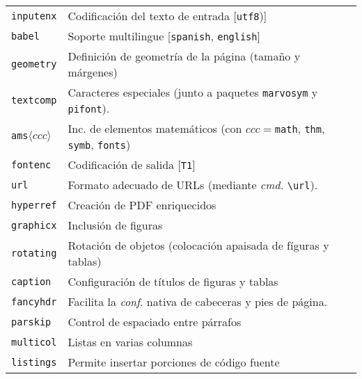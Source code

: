 \documentclass[10pt,landscape,a4paper]{article}
\begin{document}
\begin{multicols}{3}
\begin{tabular}{@{}p{\the\MyLen}%
                @{}p{\linewidth-\the\MyLen}@{}}
\texttt{inputenx}	& Codificación del texto de entrada [\texttt{utf8})]\\
\texttt{babel}		& Soporte multilingue [\texttt{spanish}, \texttt{english}]\\
\texttt{geometry}	& Definición de geometría de la página (tamaño y márgenes)\\
\texttt{textcomp}	& Caracteres especiales (junto a paquetes \texttt{marvosym} y \texttt{pifont}). \\
\texttt{ams}$\langle ccc \rangle$ & Inc. de elementos matemáticos (con $ccc=$\texttt{math}, \texttt{thm}, \texttt{symb}, \texttt{fonts})\\
\texttt{fontenc}	& Codificación de salida [\texttt{T1}]\\
\texttt{url}		& Formato adecuado de URLs (mediante \emph{cmd.} \verb!\url!). \\
\texttt{hyperref}	& Creación de PDF enriquecidos\\
\texttt{graphicx}	& Inclusión de figuras\\
\texttt{rotating}	& Rotación de objetos (colocación apaisada de fíguras y tablas)\\
\texttt{caption}	& Configuración de títulos de figuras y tablas \\
\texttt{fancyhdr}	& Facilita la \emph{conf}. nativa de cabeceras y pies de página.\\
\texttt{parskip}	& Control de espaciado entre párrafos\\
\texttt{multicol}	& Listas en varias columnas\\
\texttt{listings}	& Permite insertar porciones de código fuente\\
\end{tabular}




\end{multicols}
\end{document}
